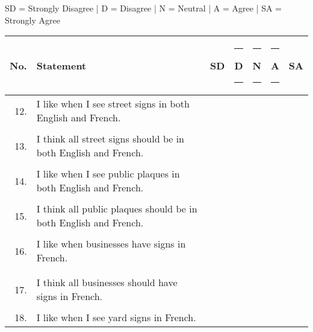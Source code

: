     {\scriptsize
        \noindent SD = Strongly Disagree | D = Disagree | N = Neutral | A = Agree | SA = Strongly Agree
    }

    \begin{longtable}[c]{| r p{} | c | c | c | c | c |}
      \hline
      No. & Statement                                                                 & SD & \rule{3pt}{0pt}D\rule{3pt}{0pt} & \rule{3pt}{0pt}N\rule{3pt}{0pt} & \rule{3pt}{0pt}A\rule{3pt}{0pt} & SA \endhead
      \hline
      \multicolumn{6}{c}{Signs} \\
      \hline
      12. & I like when I see street signs in both English and French.                & & & & & \\
          &                                                                           & & & & & \\
      \hline
      13. & I think all street signs should be in both English and French.            & & & & & \\
          &                                                                           & & & & & \\
      \hline
      14. & I like when I see public plaques in both English and French.              & & & & & \\
          &                                                                           & & & & & \\
      \hline
      15. & I think all public plaques should be in both English and French.          & & & & & \\
          &                                                                           & & & & & \\
      \hline
      16. & I like when businesses have signs in French.                              & & & & & \\
          &                                                                           & & & & & \\
          &                                                                           & & & & & \\
      \hline
      17. & I think all businesses should have signs in French.                       & & & & & \\
          &                                                                           & & & & & \\
      \hline
      18. & I like when I see yard signs in French.                                   & & & & & \\

\end{longtable}
